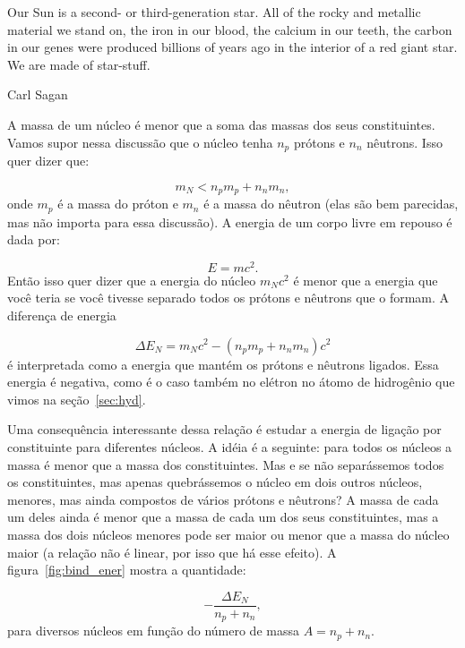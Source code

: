 \documentclass{article}
\begin{document}
\epigraph{Our Sun is a second- or third-generation star. All of the rocky and metallic material we stand on, the iron in our blood, the calcium in our teeth, the carbon in our genes were produced billions of years ago in the interior of a red giant star. We are made of star-stuff.}{Carl Sagan}

A massa de um n\'ucleo \'e menor que a soma das massas dos seus constituintes. Vamos supor nessa discuss\~ao que o n\'ucleo tenha $n_p$ pr\'otons e $n_n$ n\^eutrons. Isso quer dizer que:

\begin{equation}
m_{N} < n_pm_p + n_nm_n,
\end{equation}
onde $m_p$ \'e a massa do pr\'oton e $m_n$ \'e a massa do n\^eutron (elas s\~ao bem parecidas, mas n\~ao importa para essa discuss\~ao). A energia de um corpo livre em repouso \'e dada por:

\begin{equation}
E = mc^2.
\end{equation}
Ent\~ao isso quer dizer que a energia do n\'ucleo $m_Nc^2$ \'e menor que a energia que voc\^e teria se voc\^e tivesse separado todos os pr\'otons e n\^eutrons que o formam. A diferen\c ca de energia

\begin{equation}
\Delta E_N = m_{N}c^2 - (n_pm_p + n_nm_n)c^2
\end{equation}
\'e interpretada como a energia que mant\'em os pr\'otons e n\^eutrons ligados. Essa energia \'e negativa, como \'e o caso tamb\'em no el\'etron no \'atomo de hidrog\^enio que vimos na se\c c\~ao~\ref{sec:hyd}.

Uma consequ\^encia interessante dessa rela\c c\~ao \'e estudar a energia de liga\c c\~ao por constituinte para diferentes n\'ucleos. A id\'eia \'e a seguinte: para todos os n\'ucleos a massa \'e menor que a massa dos constituintes. Mas e se n\~ao separ\'assemos todos os constituintes, mas apenas quebr\'assemos o n\'ucleo em dois outros n\'ucleos, menores, mas ainda compostos de v\'arios pr\'otons e n\^eutrons? A massa de cada um deles ainda \'e menor que a massa de cada um dos seus constituintes, mas a massa dos dois n\'ucleos menores pode ser maior ou menor que a massa do n\'ucleo maior (a rela\c c\~ao n\~ao \'e linear, por isso que h\'a esse efeito). A figura~\ref{fig:bind_ener} mostra a quantidade:

\begin{equation}
-\frac{\Delta E_N}{n_p+n_n},
\end{equation}
para diversos n\'ucleos em fun\c c\~ao do n\'umero de massa $A=n_p+n_n$.
\end{document}
